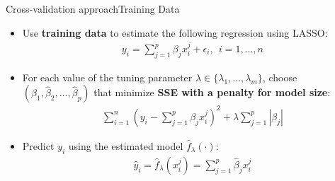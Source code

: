 \documentclass[dvipsnames,hyperref={pdfpagelabels=false}]{beamer}
\begin{document}
\begin{frame}{Cross-validation approach}{Training Data}
    \begin{itemize}
        \item Use \textbf{training data} to estimate the following 
        regression using LASSO:
        \begin{eqnarray*}
            y_{i} = \sum^{p}_{j=1} \beta_{j} x^{j}_{i} + \epsilon_{i}, 
            \ \ i=1, \ldots, n
        \end{eqnarray*}
        \vspace{0.1cm}
        \item For each value of the tuning parameter $\lambda \in \{\lambda_{1},\ldots,\lambda_{m} \}$, choose $(\hat{\beta}_{1}, \hat{\beta}_{2}, \ldots, \hat{\beta}_{p})$ 
        that minimize \textbf{SSE with a penalty for model size}:
        \begin{eqnarray*}
            \sum^{n}_{i=1} \left(y_{i} - \sum^{p}_{j=1} \beta_{j} 
            x^{j}_{i}\right)^{2} + \lambda \sum^{p}_{j=1} |\beta_{j}|
        \end{eqnarray*}
        \vspace{0.2cm}
        \item Predict $y_{i}$ using the estimated model 
        $\hat{f}_{\lambda}(\cdot)$:
        \begin{eqnarray*}
            \hat{y}_{i} = \hat{f}_{\lambda}(x^{j}_{i}) 
            = \sum^{p}_{j=1} \hat{\beta}_{j} x^{j}_{i}
        \end{eqnarray*}
    \end{itemize}
\end{frame}



		
\end{document}
